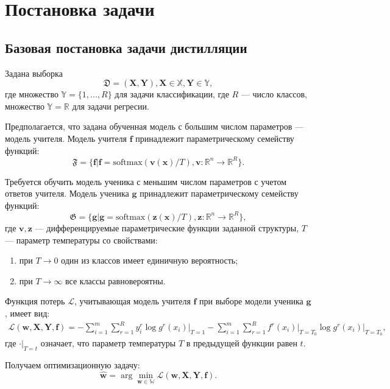 \newpage

\section{Постановка задачи}

\subsection{Базовая постановка задачи дистилляции}

Задана выборка 
$$\mathfrak{D}=(\mathbf{X},\mathbf{Y}), \mathbf{X} \in \mathbb{X}, \mathbf{Y} \in \mathbb{Y},$$
где множество $\mathbb{Y}=\{1,...,R\}$ для задачи классификации, где $R$ --- число классов, множество $\mathbb{Y}=\mathbb{R}$ для задачи регресии.

Предполагается, что задана обученная модель с большим числом параметров --- модель учителя. Модель учителя $\mathbf{f}$ принадлежит параметрическому семейству функций: $$\mathfrak{F}=\{\mathbf{f}|\mathbf{f}=\text{softmax}(\mathbf{v(x)}/T), \mathbf{v}:\mathbb{R}^{n}\rightarrow \mathbb{R}^{R}\}.$$

Требуется обучить модель ученика с меньшим числом параметров с учетом ответов учителя. Модель ученика $\mathbf{g}$ принадлежит параметрическому семейству функций: $$\mathfrak{G}=\{\mathbf{g}|\mathbf{g}=\text{softmax}(\mathbf{z(x)}/T), \mathbf{z}:\mathbb{R}^{n}\rightarrow \mathbb{R}^{R}\},$$
где $\mathbf{v, z}$ --- дифференцируемые параметрические функции заданной структуры, $T$ --- параметр температуры со свойствами:
\begin{enumerate}
    \item при $T \rightarrow 0$ один из классов имеет единичную вероятность;
    \item при $T \rightarrow \infty$ все классы равновероятны.
\end{enumerate}

Функция потерь $\mathcal{L}$, учитывающая модель учителя $\mathbf{f}$ при выборе модели ученика $\mathbf{g}$, имеет вид:
\[
\begin{aligned}
    \mathcal{L}(\mathbf{w,X,Y,f})=-\sum\limits_{i=1}^{m}\sum\limits_{r=1}^{R}y_{i}^{r}\log{g^{r}(x_{i})}\bigr|_{T=1}-\sum\limits_{i=1}^{m}\sum\limits_{r=1}^{R}f^{r}(x_{i})\bigr|_{T=T_{0}}\log{g^{r}(x_{i})}\bigr|_{T=T_{0}},
\end{aligned}
\]
где $\cdot\bigr|_{T=t}$ означает, что параметр температуры $T$ в предыдущей функции равен $t$.

Получаем оптимизационную задачу:
$$\hat{\mathbf{w}} = \arg\min_{\mathbf{w} \in \mathbb{W}} \mathcal{L}(\mathbf{w,X,Y,f}).$$


